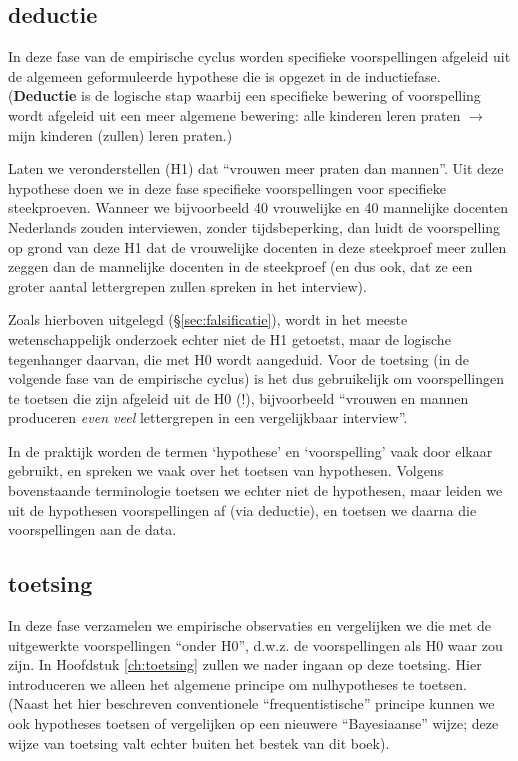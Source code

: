 \documentclass[
]{book}
\begin{document}
\hypertarget{deductie}{%
\subsection{deductie}\label{deductie}}

In deze fase van de empirische cyclus worden specifieke voorspellingen
afgeleid uit de algemeen geformuleerde hypothese die is opgezet in de
inductiefase. (\textbf{Deductie} is de logische stap waarbij een specifieke
bewering of voorspelling wordt afgeleid uit een meer algemene bewering:
alle kinderen leren praten \(\rightarrow\) mijn kinderen (zullen) leren
praten.)

Laten we veronderstellen (H1) dat ``vrouwen meer praten dan mannen''. Uit
deze hypothese doen we in deze fase specifieke voorspellingen voor
specifieke steekproeven. Wanneer we bijvoorbeeld 40 vrouwelijke en 40
mannelijke docenten Nederlands zouden interviewen, zonder
tijdsbeperking, dan luidt de voorspelling op grond van deze H1 dat de
vrouwelijke docenten in deze steekproef meer zullen zeggen dan de
mannelijke docenten in de steekproef (en dus ook, dat ze een groter
aantal lettergrepen zullen spreken in het interview).

Zoals hierboven uitgelegd (§\ref{sec:falsificatie}), wordt in het meeste wetenschappelijk
onderzoek echter niet de H1 getoetst, maar de logische tegenhanger
daarvan, die met H0 wordt aangeduid.
Voor de toetsing (in de volgende fase van de empirische
cyclus) is het dus gebruikelijk om voorspellingen te toetsen die zijn
afgeleid uit de H0 (!), bijvoorbeeld ``vrouwen en mannen produceren \emph{even veel} lettergrepen in een vergelijkbaar interview''.

In de praktijk worden de termen `hypothese' en `voorspelling' vaak door
elkaar gebruikt, en spreken we vaak over het toetsen van hypothesen.
Volgens bovenstaande terminologie toetsen we echter niet de hypothesen, maar leiden we uit de hypothesen voorspellingen af (via deductie), en toetsen we daarna die voorspellingen aan de data.

\hypertarget{toetsing}{%
\subsection{toetsing}\label{toetsing}}

In deze fase verzamelen we empirische observaties en vergelijken we die
met de uitgewerkte voorspellingen ``onder H0'', d.w.z. de voorspellingen
als H0 waar zou zijn. In Hoofdstuk \ref{ch:toetsing} zullen we nader ingaan op deze toetsing. Hier introduceren we alleen het algemene principe om nulhypotheses te toetsen. (Naast het hier beschreven conventionele ``frequentistische'' principe kunnen we ook hypotheses toetsen of vergelijken op een nieuwere ``Bayesiaanse'' wijze; deze wijze van toetsing valt echter buiten het bestek van dit boek).
\end{document}
